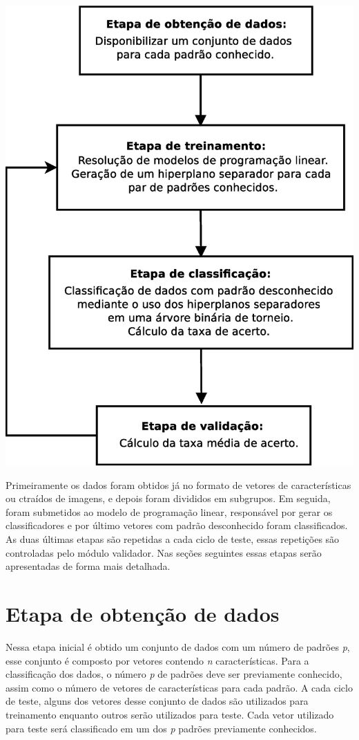 \begin{center}
	\includegraphics[scale=0.5]{graficos/diagrama_metodologia}
	\label{img:diagrama_modulos}
\end{center}

Primeiramente os dados foram obtidos já no formato de vetores de características ou  ctraídos de imagens, e depois foram divididos em subgrupos. Em seguida, foram submetidos ao modelo de programação linear, responsável por gerar os classificadores e por último vetores com padrão desconhecido foram classificados. As duas últimas etapas são repetidas a cada ciclo de teste, essas repetições são controladas pelo módulo validador. Nas seções seguintes essas etapas serão apresentadas de forma mais detalhada.

\section{Etapa de obtenção de dados}
Nessa etapa inicial é obtido um conjunto de dados com um número de padrões \textit{p}, esse conjunto é composto por vetores contendo \textit{n} características. Para a classificação dos dados, o número \textit{p} de padrões deve ser previamente conhecido, assim como o número de vetores de características para cada padrão. A cada ciclo de teste, alguns dos vetores desse conjunto de dados são utilizados para treinamento enquanto outros serão utilizados para teste. Cada vetor utilizado para teste será classificado em um dos \textit{p} padrões previamente conhecidos.

